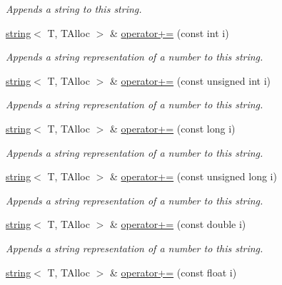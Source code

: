 \begin{DoxyCompactItemize}
\begin{DoxyCompactList}\small\item\em Appends a string to this string. \end{DoxyCompactList}\item 
\hyperlink{classirr_1_1core_1_1string}{string}$<$ T, T\+Alloc $>$ \& \hyperlink{classirr_1_1core_1_1string_a45dc4947705395c8e700b430e1187d89}{operator+=} (const int i)
\begin{DoxyCompactList}\small\item\em Appends a string representation of a number to this string. \end{DoxyCompactList}\item 
\hyperlink{classirr_1_1core_1_1string}{string}$<$ T, T\+Alloc $>$ \& \hyperlink{classirr_1_1core_1_1string_afd43f9db4da3846563922b0f65fc4307}{operator+=} (const unsigned int i)
\begin{DoxyCompactList}\small\item\em Appends a string representation of a number to this string. \end{DoxyCompactList}\item 
\hyperlink{classirr_1_1core_1_1string}{string}$<$ T, T\+Alloc $>$ \& \hyperlink{classirr_1_1core_1_1string_a281c2e52a1af99fc906531ca1a419857}{operator+=} (const long i)
\begin{DoxyCompactList}\small\item\em Appends a string representation of a number to this string. \end{DoxyCompactList}\item 
\hyperlink{classirr_1_1core_1_1string}{string}$<$ T, T\+Alloc $>$ \& \hyperlink{classirr_1_1core_1_1string_a68c816190a129a02cd5d23b319404b0f}{operator+=} (const unsigned long i)
\begin{DoxyCompactList}\small\item\em Appends a string representation of a number to this string. \end{DoxyCompactList}\item 
\hyperlink{classirr_1_1core_1_1string}{string}$<$ T, T\+Alloc $>$ \& \hyperlink{classirr_1_1core_1_1string_acf21ca69167b81fd0c79933a846e17dc}{operator+=} (const double i)
\begin{DoxyCompactList}\small\item\em Appends a string representation of a number to this string. \end{DoxyCompactList}\item 
\hyperlink{classirr_1_1core_1_1string}{string}$<$ T, T\+Alloc $>$ \& \hyperlink{classirr_1_1core_1_1string_a7ca4fa1a02e7992a41d1db5b87760654}{operator+=} (const float i)

\end{DoxyCompactItemize}
